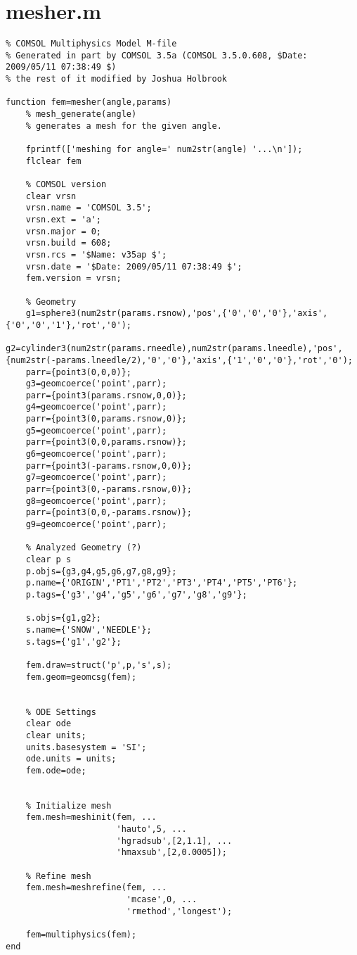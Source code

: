 \section{mesher.m}
\small
\begin{verbatim}
% COMSOL Multiphysics Model M-file
% Generated in part by COMSOL 3.5a (COMSOL 3.5.0.608, $Date: 2009/05/11 07:38:49 $)
% the rest of it modified by Joshua Holbrook

function fem=mesher(angle,params)
    % mesh_generate(angle)
    % generates a mesh for the given angle. 

    fprintf(['meshing for angle=' num2str(angle) '...\n']);
    flclear fem

    % COMSOL version
    clear vrsn
    vrsn.name = 'COMSOL 3.5';
    vrsn.ext = 'a';
    vrsn.major = 0;
    vrsn.build = 608;
    vrsn.rcs = '$Name: v35ap $';
    vrsn.date = '$Date: 2009/05/11 07:38:49 $';
    fem.version = vrsn;

    % Geometry
    g1=sphere3(num2str(params.rsnow),'pos',{'0','0','0'},'axis',{'0','0','1'},'rot','0');
    g2=cylinder3(num2str(params.rneedle),num2str(params.lneedle),'pos',{num2str(-params.lneedle/2),'0','0'},'axis',{'1','0','0'},'rot','0');
    parr={point3(0,0,0)};
    g3=geomcoerce('point',parr);
    parr={point3(params.rsnow,0,0)};
    g4=geomcoerce('point',parr);
    parr={point3(0,params.rsnow,0)};
    g5=geomcoerce('point',parr);
    parr={point3(0,0,params.rsnow)};
    g6=geomcoerce('point',parr);
    parr={point3(-params.rsnow,0,0)};
    g7=geomcoerce('point',parr);
    parr={point3(0,-params.rsnow,0)};
    g8=geomcoerce('point',parr);
    parr={point3(0,0,-params.rsnow)};
    g9=geomcoerce('point',parr);

    % Analyzed Geometry (?)
    clear p s
    p.objs={g3,g4,g5,g6,g7,g8,g9};
    p.name={'ORIGIN','PT1','PT2','PT3','PT4','PT5','PT6'};
    p.tags={'g3','g4','g5','g6','g7','g8','g9'};

    s.objs={g1,g2};
    s.name={'SNOW','NEEDLE'};
    s.tags={'g1','g2'};

    fem.draw=struct('p',p,'s',s);
    fem.geom=geomcsg(fem);


    % ODE Settings
    clear ode
    clear units;
    units.basesystem = 'SI';
    ode.units = units;
    fem.ode=ode;


    % Initialize mesh
    fem.mesh=meshinit(fem, ...
                      'hauto',5, ...
                      'hgradsub',[2,1.1], ...
                      'hmaxsub',[2,0.0005]);

    % Refine mesh
    fem.mesh=meshrefine(fem, ...
                        'mcase',0, ...
                        'rmethod','longest');

    fem=multiphysics(fem);
end
\end{verbatim}
\normalsize

